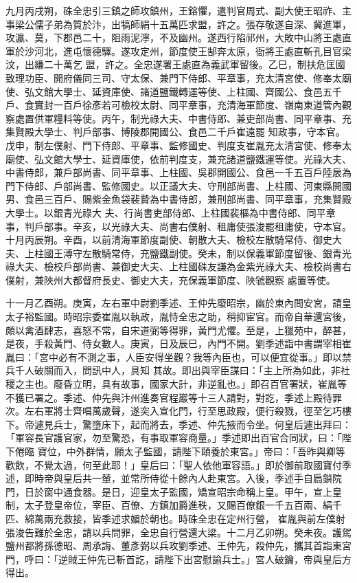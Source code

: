 \begin{pinyinscope}
 九月丙戌朔，硃全忠引三鎮之師攻鎮州，王鎔懼，遣判官周式、副大使王昭祚、主事梁公儒子弟為質於汴，出犒師絹十五萬匹求盟，許之。張存敬遂自深、冀進軍，攻瀛、莫，下郡邑二十，阻雨泥濘，不及幽州。遂西行陷祁州，大敗中山將王處直軍於沙河北，進屯懷德驛。遂攻定州，節度使王郜奔太原，衙將王處直斬孔目官梁汶，出縑二十萬乞
 盟，許之。全忠遂署王處直為義武軍留後。乙巳，制扶危匡國致理功臣、開府儀同三司、守太保、兼門下侍郎、平章事，充太清宮使、修奉太廟使、弘文館大學士、延資庫使、諸道鹽鐵轉運等使、上柱國、齊國公、食邑五千戶、食實封一百戶徐彥若可檢校太尉、同平章事，充清海軍節度、嶺南東道管內觀察處置供軍糧料等使。丙午，制光祿大夫、中書侍郎、兼吏部尚書、同平章事、充集賢殿大學士、判戶部事、博陵郡開國公、食邑二千戶崔遠罷
 知政事，守本官。戊申，制左僕射、門下侍郎、平章事、監修國史、判度支崔胤充太清宮使、修奉太廟使、弘文館大學士、延資庫使，依前判度支，兼充諸道鹽鐵運等使。光祿大夫、中書侍郎，兼戶部尚書、同平章事、上柱國、吳郡開國公、食邑一千五百戶陸扆為門下侍郎、戶部尚書、監修國史。以正議大夫、守刑部尚書、上柱國、河東縣開國男、食邑三百戶、賜紫金魚袋裴贄為中書侍郎，兼刑部尚書、同平章事，充集賢殿大學士。以銀青光祿大
 夫、行尚書吏部侍郎、上柱國裴樞為中書侍郎、同平章事，判戶部事。辛亥，以光祿大夫、尚書右僕射、租庸使張浚罷租庸使，守本官。十月丙辰朔。辛酉，以前清海軍節度副使、朝散大夫、檢校左散騎常侍、御史大夫、上柱國王溥守左散騎常侍，充鹽鐵副使。癸未，制以保義軍節度留後、銀青光祿大夫、檢校戶部尚書、兼御史大夫、上柱國硃友謙為金紫光祿大夫、檢校尚書右僕射，兼陜州大都督府長史、御史大夫，充保義軍節度、陜虢觀察
 處置等使。



 十一月乙酉朔。庚寅，左右軍中尉劉季述、王仲先廢昭宗，幽於東內問安宮，請皇太子裕監國。時昭宗委崔胤以執政，胤恃全忠之助，稍抑宦官。而帝自華還宮後，頗以禽酒肆志，喜怒不常，自宋道弼等得罪，黃門尤懼。至是，上獵苑中，醉甚，是夜，手殺黃門、侍女數人。庚寅，日及辰巳，內門不開。劉季述詣中書謂宰相崔胤曰：「宮中必有不測之事，人臣安得坐觀？我等內臣也，可以便宜從事。」即以禁兵千人破關而入，問訊中人，具知
 其故。即出與宰臣謀曰：「主上所為如此，非社稷之主也。廢昏立明，具有故事，國家大計，非逆亂也。」即召百官署狀，崔胤等不獲已署之。季述、仲先與汴州進奏官程巖等十三人請對，對訖，季述上殿待罪次。左右軍將士齊唱萬歲聲，遂突入宣化門，行至思政殿，便行殺戮，徑至乞巧樓下。帝遽見兵士，驚墮床下，起而將去，季述、仲先掖而令坐。何皇后遽出拜曰：「軍容長官護官家，勿至驚恐，有事取軍容商量。」季述即出百官合同狀，曰：「陛下倦臨
 寶位，中外群情，願太子監國，請陛下頤養於東宮。」帝曰：「吾昨與卿等歡飲，不覺太過，何至此耶！」皇后曰：「聖人依他軍容語。」即於御前取國寶付季述，即時帝與皇后共一輦，並常所侍從十餘內人赴東宮。入後，季述手自扃鎖院門，日於窗中通食器。是日，迎皇太子監國，矯宣昭宗命稱上皇。甲午，宣上皇制，太子登皇帝位，宰臣、百僚、方鎮加爵進秩，又賜百僚銀一千五百兩、絹千匹、綿萬兩充救接，皆季述求媚於朝也。時硃全忠在定州行營，
 崔胤與前左僕射張浚告難於全忠，請以兵問罪，全忠自行營還大梁。十二月乙卯朔。癸未夜。護駕鹽州都將孫德昭、周承誨、董彥弼以兵攻劉季述、王仲先，殺仲先，攜其首詣東宮門，呼曰：「逆賊王仲先已斬首訖，請陛下出宮慰諭兵士。」宮人破鑰，帝與皇后方得出。




\end{pinyinscope}
